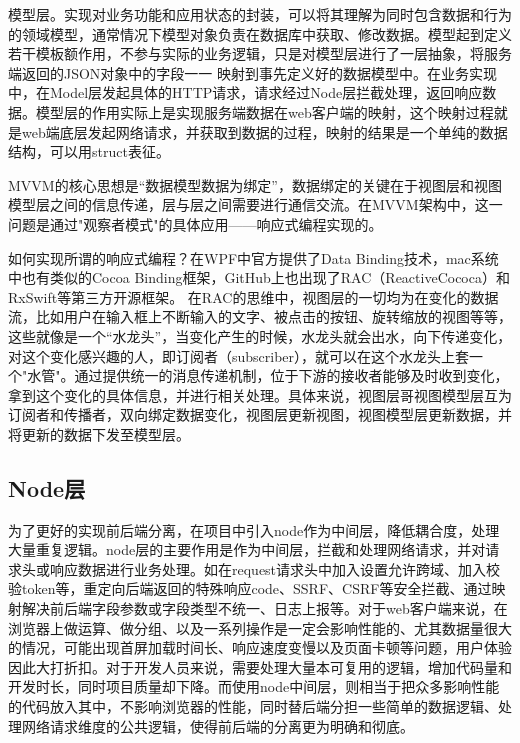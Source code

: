 模型层。实现对业务功能和应用状态的封装，可以将其理解为同时包含数据和行为的领域模型，通常情况下模型对象负责在数据库中获取、修改数据。模型起到定义若干模板额作用，不参与实际的业务逻辑，只是对模型层进行了一层抽象，将服务端返回的JSON对象中的字段一一 映射到事先定义好的数据模型中。在业务实现中，在Model层发起具体的HTTP请求，请求经过Node层拦截处理，返回响应数据。模型层的作用实际上是实现服务端数据在web客户端的映射，这个映射过程就是web端底层发起网络请求，并获取到数据的过程，映射的结果是一个单纯的数据结构，可以用struct表征。

MVVM的核心思想是“数据模型数据为绑定”，数据绑定的关键在于视图层和视图模型层之间的信息传递，层与层之间需要进行通信交流。在MVVM架构中，这一问题是通过"观察者模式"的具体应用——响应式编程实现的。

如何实现所谓的响应式编程？在WPF中官方提供了Data Binding技术，mac系统中也有类似的Cocoa Binding框架，GitHub上也出现了RAC（ReactiveCococa）和RxSwift等第三方开源框架。
在RAC的思维中，视图层的一切均为在变化的数据流，比如用户在输入框上不断输入的文字、被点击的按钮、旋转缩放的视图等等，这些就像是一个“水龙头”，当变化产生的时候，水龙头就会出水，向下传递变化，对这个变化感兴趣的人，即订阅者（subscriber），就可以在这个水龙头上套一个"水管"。通过提供统一的消息传递机制，位于下游的接收者能够及时收到变化，拿到这个变化的具体信息，并进行相关处理。具体来说，视图层哥视图模型层互为订阅者和传播者，双向绑定数据变化，视图层更新视图，视图模型层更新数据，并将更新的数据下发至模型层。
\subsection{Node层}
为了更好的实现前后端分离，在项目中引入node作为中间层，降低耦合度，处理大量重复逻辑。node层的主要作用是作为中间层，拦截和处理网络请求，并对请求头或响应数据进行业务处理。如在request请求头中加入设置允许跨域、加入校验token等，重定向后端返回的特殊响应code、SSRF、CSRF等安全拦截、通过映射解决前后端字段参数或字段类型不统一、日志上报等。对于web客户端来说，在浏览器上做运算、做分组、以及一系列操作是一定会影响性能的、尤其数据量很大的情况，可能出现首屏加载时间长、响应速度变慢以及页面卡顿等问题，用户体验因此大打折扣。对于开发人员来说，需要处理大量本可复用的逻辑，增加代码量和开发时长，同时项目质量却下降。而使用node中间层，则相当于把众多影响性能的代码放入其中，不影响浏览器的性能，同时替后端分担一些简单的数据逻辑、处理网络请求维度的公共逻辑，使得前后端的分离更为明确和彻底。

